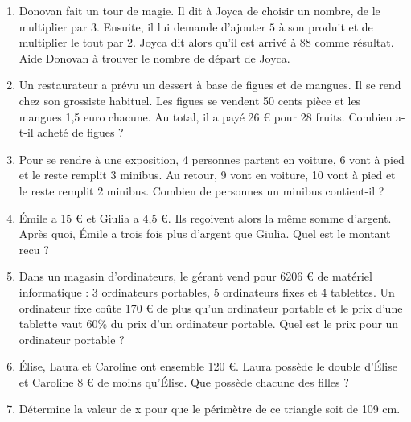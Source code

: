 \documentclass[parskip=half-, 12pt, DIV=15, twoside=semi]{scrbook}
\begin{document}
\begin{exercise}
\begin{enumerate}
        \item Donovan fait un tour de magie. Il dit à Joyca de choisir un nombre, de
              le multiplier par $3$. Ensuite, il lui demande d'ajouter $5$ à son
              produit et de multiplier le tout par $2$. Joyca dit alors qu'il
              est arrivé à $88$ comme résultat. Aide Donovan à trouver le nombre de
              départ de Joyca.
        \item Un  restaurateur a prévu un dessert à base de figues et de mangues. Il se rend chez son grossiste habituel. Les figues se vendent 50 cents pièce et les mangues 1,5 euro chacune. Au total, il a payé 26 € pour 28 fruits. Combien a-t-il acheté de figues ?
        \item Pour  se rendre à une exposition, 4 personnes partent en voiture, 6 vont à pied et le reste remplit 3 minibus.
        Au retour, 9 vont en voiture, 10 vont à pied et le reste remplit 2 minibus.
        Combien de personnes un minibus contient-il ?
        \item Émile  a 15 € et Giulia a 4,5 €. Ils reçoivent alors la même somme d'argent. Après quoi, Émile a trois fois plus d'argent que Giulia. Quel est le montant recu ?
        \item Dans un magasin d'ordinateurs, le gérant vend pour 6206 € de matériel informatique : 3 ordinateurs portables, 5 ordinateurs fixes et 4 tablettes. Un ordinateur fixe coûte 170 € de plus qu'un ordinateur portable et le prix d'une tablette vaut 60\% du prix d'un ordinateur portable. Quel est le prix pour un ordinateur portable ?
        \item Élise, Laura et Caroline ont ensemble 120 €. Laura possède le double d'Élise et Caroline 8  € de moins qu'Élise. Que possède chacune des filles ?
        \item Détermine la valeur de x pour que le périmètre de ce triangle soit de 109 cm.
      \end{enumerate}
\end{exercise}
\end{document}
